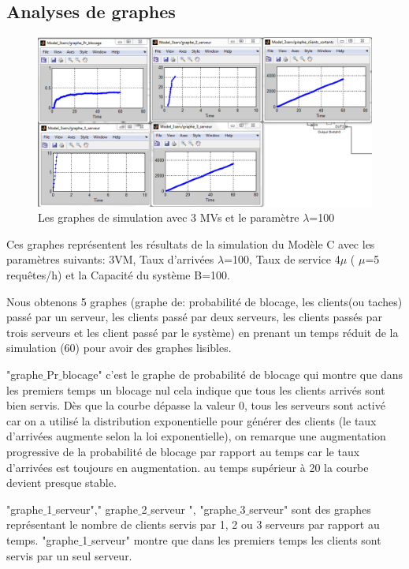 \subsection{Analyses de graphes}
\begin{figure}[ht!]
\centering
\includegraphics[width=0.95 \textwidth]{photo/graphe_model_3MV.png}
\caption{Les graphes de simulation avec 3 MVs et le paramètre $\lambda$=100}
\label{fig:graphe1}
\end{figure}
\newpage
\noindent Ces graphes représentent les résultats de la simulation du Modèle C avec les paramètres suivants: 3VM, Taux d’arrivées  $\lambda$=100, Taux de service  4$\mu$ ( $\mu$=5 requêtes/h) et la Capacité du système B=100.

Nous obtenons 5 graphes (graphe de: probabilité de blocage, les clients(ou taches) passé par un serveur, les clients passé par deux serveurs, les clients passés par trois serveurs et les client passé par le système) en prenant un temps réduit de la simulation (60) pour avoir des graphes lisibles.

"graphe$\_$Pr$\_$blocage" c'est le graphe de probabilité de blocage qui montre que dans les premiers temps un blocage nul cela indique que tous les clients arrivés sont bien servis. Dès que la courbe dépasse la valeur 0, tous les serveurs sont activé car on a utilisé la distribution exponentielle pour générer des clients (le taux d'arrivées augmente selon la loi exponentielle), on remarque une augmentation progressive de la probabilité de blocage par rapport au temps car le taux d'arrivées est toujours en augmentation. au temps supérieur à 20 la courbe devient presque stable.

"graphe$\_$1$\_$serveur"," graphe$\_$2$\_$serveur ", "graphe$\_$3$\_$serveur" sont des graphes représentant le nombre de clients servis par 1, 2 ou 3 serveurs par rapport au temps. "graphe$\_$1$\_$serveur" montre que dans les premiers temps les clients sont servis par un seul serveur.

